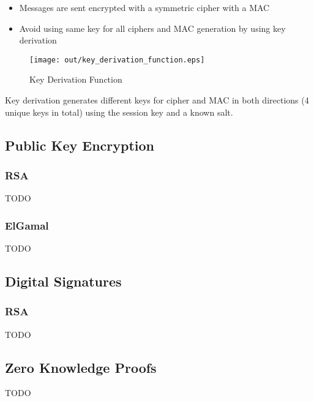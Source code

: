 \documentclass[a4paper]{article}
\begin{document}
\begin{itemize}
  \item Messages are sent encrypted with a symmetric cipher with a MAC
  \item Avoid using same key for all ciphers and MAC generation by using key
        derivation
\end{itemize}

\begin{figure}[h!]
  \centering
  \texttt{[image: out/key\_derivation\_function.eps]}
  \caption{Key Derivation Function}
  \label{fig:key_derivation_function}
\end{figure}
\FloatBarrier

Key derivation generates different keys for cipher and MAC in both directions (4
unique keys in total) using the session key and a known salt.

\subsection{Public Key Encryption}

\subsubsection{RSA}

TODO

\subsubsection{ElGamal}

TODO

\subsection{Digital Signatures}

\subsubsection{RSA}

TODO

\subsection{Zero Knowledge Proofs}

TODO
\end{document}
